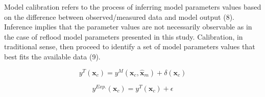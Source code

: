 
Model calibration refers to the process of inferring model parameters values based on the difference between observed/measured data and model output (8).
Inference implies that the parameter values are not necessarily observable as in the case of reflood model parameters presented in this study.
Calibration, in traditional sense, then proceed to identify a set of model parameters values that best fits the available data (9).






\begin{equation}
    y^T(\bm{x}_c) = y^M (\bm{x}_c, \bm{\hat{x}}_m) + \delta(\bm{x}_c)
\label{eq:bc_koh_true_model}
\end{equation}

\begin{equation}
    y^{Exp.}(\bm{x}_c) = y^T (\bm{x}_c) + \epsilon
\label{eq:bc_koh_true_measured}
\end{equation}



